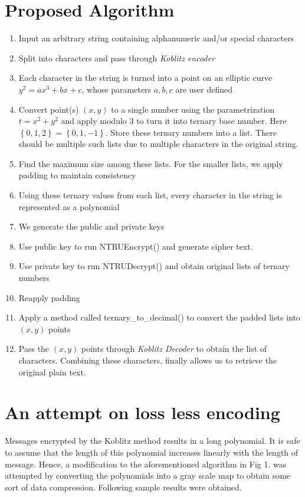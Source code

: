 \documentclass[a4paper,12pt]{article}
\begin{document}
\section{Proposed Algorithm}
\begin{enumerate}
    \item Input an arbitrary string containing alphanumeric and/or special characters
    \item Split into characters and pass through \textit{Koblitz encoder}
    \item Each character in the string is turned into a point on an elliptic curve $y^2=ax^3+bx+c$, whose parameters $a,b,c$ are user defined
    \item Convert point(s) $(x,y)$ to a single number using the parametrization $t=x^2+y^2$ and apply modulo 3 to turn it into ternary base number. Here $\left\{0,1,2\right\}=\left\{0,1,-1\right\}$. Store these ternary numbers into a list. There should be multiple such lists due to multiple characters in the original string.
    \item Find the maximum size among these lists. For the smaller lists, we apply padding to maintain consistency
    \item Using these ternary values from each list, every character in the string is represented as a polynomial
    \item We generate the public and private keys
    \item Use public key to run NTRUEncrypt() and generate cipher text.
    \item Use private key to run NTRUDecrypt() and obtain original lists of ternary numbers
    \item Reapply padding
    \item Apply a method called ternary\_to\_decimal() to convert the padded lists into $(x,y)$ points
    \item Pass the $(x,y)$ points through \textit{Koblitz Decoder} to obtain the list of characters. Combining these characters, finally allows us to retrieve the original plain text.
\end{enumerate}

\section{An attempt on loss less encoding}
Messages encrypted by the Koblitz method results in a long polynomial. It is safe to assume that the length of this polynomial increases linearly with the length of message. Hence, a modification to the aforementioned algorithm in Fig 1. was attempted by converting the polynomials into a gray scale map to obtain some sort of data compression. Following sample results were obtained.
\end{document}
